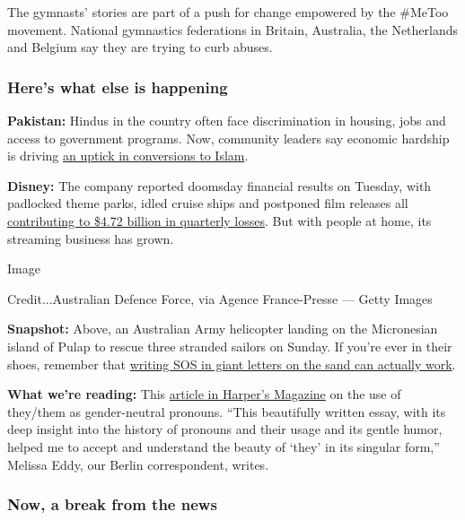 The gymnasts' stories are part of a push for change empowered by the
\#MeToo movement. National gymnastics federations in Britain, Australia,
the Netherlands and Belgium say they are trying to curb abuses.

\hypertarget{heres-what-else-is-happening}{%
\subsubsection{Here's what else is
happening}\label{heres-what-else-is-happening}}

\textbf{Pakistan:} Hindus in the country often face discrimination in
housing, jobs and access to government programs. Now, community leaders
say economic hardship is driving
\href{https://www.nytimes.com/2020/08/04/world/asia/pakistan-hindu-conversion.html}{an
uptick in conversions to Islam}.

\textbf{Disney:} The company reported doomsday financial results on
Tuesday, with padlocked theme parks, idled cruise ships and postponed
film releases all
\href{https://www.nytimes.com/live/2020/08/04/business/stock-market-today-coronavirus\#disney-lost-4-7-billion-last-quarter-but-its-newest-business-was-a-big-hit}{contributing
to \$4.72 billion in quarterly losses}. But with people at home, its
streaming business has grown.

Image

Credit...Australian Defence Force, via Agence France-Presse --- Getty
Images

\textbf{Snapshot:} Above, an Australian Army helicopter landing on the
Micronesian island of Pulap to rescue three stranded sailors on Sunday.
If you're ever in their shoes, remember that
\href{https://www.nytimes.com/2020/08/04/world/australia/sos-pacific-island.html}{writing
SOS in giant letters on the sand can actually work}.

\textbf{What we're reading:} This
\href{https://harpers.org/archive/2020/08/all-my-pronouns-the-singular-they/}{article
in Harper's Magazine} on the use of they/them as gender-neutral
pronouns. ``This beautifully written essay, with its deep insight into
the history of pronouns and their usage and its gentle humor, helped me
to accept and understand the beauty of `they' in its singular form,''
Melissa Eddy, our Berlin correspondent, writes.

\hypertarget{now-a-break-from-the-news}{%
\subsubsection{Now, a break from the
news}\label{now-a-break-from-the-news}}

